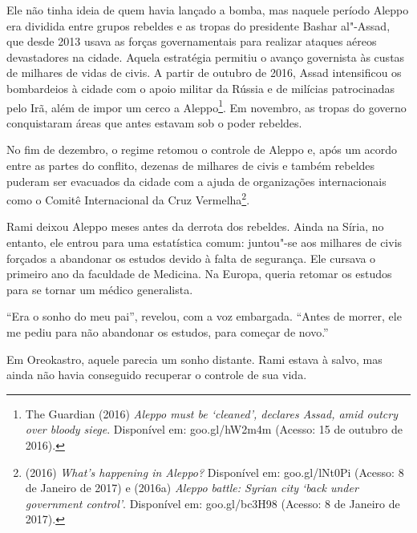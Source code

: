 Ele não tinha ideia de quem havia lançado a bomba, mas naquele período
Aleppo era dividida entre grupos rebeldes e as tropas do presidente
Bashar al"-Assad, que desde 2013 usava as forças governamentais para
realizar ataques aéreos devastadores na cidade. Aquela estratégia
permitiu o avanço governista às custas de milhares de vidas de civis.
A partir de outubro de 2016, Assad intensificou os bombardeios à
cidade com o apoio militar da Rússia e de milícias patrocinadas pelo
Irã, além de impor um cerco a Aleppo\footnote{ The Guardian (2016) \emph{Aleppo must be `cleaned',
declares Assad, amid outcry over bloody siege}. Disponível em:
goo.gl/hW2m4m
(Acesso: 15 de outubro de 2016).}. Em
novembro, as tropas do governo conquistaram áreas que antes estavam sob o poder
rebeldes.

No fim de dezembro, o regime retomou o controle de Aleppo e, após um
acordo entre as partes do conflito, dezenas de milhares de civis e
também rebeldes puderam ser evacuados da cidade com a ajuda de
organizações internacionais como o Comitê Internacional da Cruz
Vermelha\footnote{  (2016) \emph{What}\emph{'}\emph{s happening in
Aleppo?} Disponível em:
goo.gl/lNt0Pi
(Acesso: 8 de Janeiro
de 2017) e  (2016a) \emph{Aleppo battle: Syrian city}
\emph{`}\emph{back under government control}\emph{'}. Disponível em:
goo.gl/bc3H98
(Acesso: 8 de Janeiro
de 2017).}.

Rami deixou Aleppo meses antes da derrota dos rebeldes. Ainda na Síria,
no entanto, ele entrou para uma estatística comum: juntou"-se aos milhares
de civis forçados a abandonar os estudos devido à falta de segurança.
Ele cursava o primeiro ano da faculdade de Medicina. Na Europa, queria
retomar os estudos para se tornar um médico generalista.

``Era o sonho do meu pai'', revelou, com a voz embargada. ``Antes de morrer, 
ele me pediu para não abandonar os estudos, para começar de novo.''

Em Oreokastro, aquele parecia um sonho distante. Rami estava à salvo,
mas ainda não havia conseguido recuperar o controle de sua vida.

